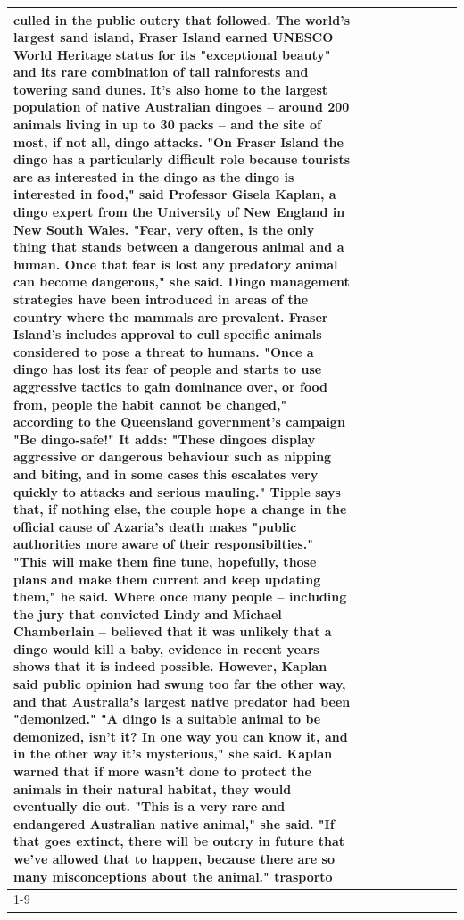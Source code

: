 \begin{table}[H]
\begin{tabular}{lllrlllll}
culled in the public outcry that followed. The world's largest sand island, Fraser Island earned UNESCO World Heritage status for its "exceptional beauty" and its rare combination of tall rainforests and towering sand dunes. It's also home to the largest population of native Australian dingoes -- around 200 animals living in up to 30 packs -- and the site of most, if not all, dingo attacks. "On Fraser Island the dingo has a particularly difficult role because tourists are as interested in the dingo as the dingo is interested in food," said Professor Gisela Kaplan, a dingo expert from the University of New England in New South Wales. "Fear, very often, is the only thing that stands between a dangerous animal and a human. Once that fear is lost any predatory animal can become dangerous," she said. Dingo management strategies have been introduced in areas of the country where the mammals are prevalent. Fraser Island's includes approval to cull specific animals considered to pose a threat to humans. "Once a dingo has lost its fear of people and starts to use aggressive tactics to gain dominance over, or food from, people the habit cannot be changed," according to the Queensland government's campaign "Be dingo-safe!" It adds: "These dingoes display aggressive or dangerous behaviour such as nipping and biting, and in some cases this escalates very quickly to attacks and serious mauling." Tipple says that, if nothing else, the couple hope a change in the official cause of Azaria's death makes "public authorities more aware of their responsibilties." "This will make them fine tune, hopefully, those plans and make them current and keep updating them," he said. Where once many people -- including the jury that convicted Lindy and Michael Chamberlain -- believed that it was unlikely that a dingo would kill a baby, evidence in recent years shows that it is indeed possible. However, Kaplan said public opinion had swung too far the other way, and that Australia's largest native predator had been "demonized." "A dingo is a suitable animal to be demonized, isn't it? In one way you can know it, and in the other way it's mysterious," she said. Kaplan warned that if more wasn't done to protect the animals in their natural habitat, they would eventually die out. "This is a very rare and endangered Australian native animal," she said. "If that goes extinct, there will be outcry in future that we've allowed that to happen, because there are so many misconceptions about the animal." trasporto \\
\cline{1-9}

\end{tabular}
\end{table}
